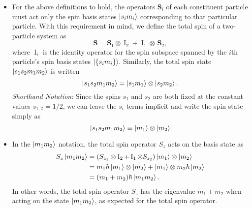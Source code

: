 \documentclass[11pt, a4paper]{article}
\renewcommand{\vec}[1]{\bm{#1}}  %
\renewcommand{\S}{\vec{S}}  %
\newcommand{\II}{\operatorname{I}}  %
\begin{document}
\begin{itemize}
    \item For the above definitions to hold, the operators $ \S_{i} $ of each constituent particle must act only the spin basis states $ \ket{s_{i}m_{i}} $ corresponding to that particular particle. With this requirement in mind, we define the total spin of a two-particle system as
	\begin{equation*}
		\S = \S_{1}\otimes \II_{2} + \II_{1} \otimes \, \S_{2},
	\end{equation*}
	where $ \II_{i} $ is the identity operator for the spin subspace spanned by the $ i $th particle's spin basis states $ \ket{\{s_{i}m_{i}\}} $. Similarly, the total spin state $ \ket{s_{1}s_{2}m_{1}m_{2}} $ is written
	\begin{equation*}
		\ket{s_{1}s_{2}m_{1}m_{2}}  = \ket{s_{1}m_{1}} \otimes \ket{s_{2}m_{2}}.
	\end{equation*}
	\textit{Shorthand Notation}: Since the spins $ s_{1} $ and $ s_{2} $ are both fixed at the constant values $ s_{1,2} = 1/2 $, we can leave the $ s_{i} $ terms implicit and write the spin state simply as
    \begin{equation*}
        \ket{s_{1}s_{2}m_{1}m_{2}} \equiv \ket{m_{1}} \otimes \ket{m_{2}} 
    \end{equation*}
        
    \item In the $ \ket{m_{1}m_{2}} $ notation, the total spin operator $ S_{z} $ acts on the basis state as
    \begin{align*}
        S_{z}\ket{m_{1}m_{2}} &= (S_{z_{1}}\otimes \II_{2} + \II_{1}\otimes S_{z_{2}})\ket{m_{1}} \otimes \ket{m_{2}}\\
        &= m_{1}\hbar \ket{m_{1}} \otimes \ket{m_{2}} + \ket{m_{1}}\otimes m_{2}\hbar \ket{m_{2}}\\
        &=(m_{1} + m_{2}) \hbar \ket{m_{1}m_{2}}.
    \end{align*}
    In other words, the total spin operator $ S_{z} $ has the eigenvalue $ m_{1} + m_{2} $ when acting on the state $ \ket{m_{1}m_{2}} $, as expected for the total spin operator.


\end{itemize}
\end{document}
